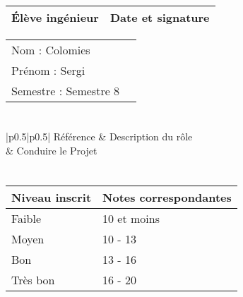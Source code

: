 \documentclass[11pt]{article}
\begin{document}

\begin{center}
\begin{table}[!hp]

	\begin{tabularx}{\linewidth}{|X|X|}
	\hline
	\rowcolor{gray!40} Élève ingénieur & Date et signature \\
	\hline
	\end{tabularx}
	\begin{tabularx}{\linewidth}{|X|X|}
	Nom : Colomies &  \\ 
	Prénom : Sergi & \\
	Semestre : Semestre 8 & \\
	\hline
	\end{tabularx}
\end{table}
\end{center}

\section*{\large\FR}

\centering
	\begin{longtable}{|p{0.5\textwidth}|p{0.5\textwidth}|}
	\hline
	 Référence \WBSCourt & Description du rôle \\
	 & Conduire le Projet \\
	 \hline
	\end{longtable}


\section*{\large\FC}


\begin{table}[!hp]
\centering
	\begin{tabularx}{\linewidth}{|X|X|}
	\hline
	\rowcolor{gray!40} Niveau inscrit & Notes correspondantes \\
	\hline
	 Faible & 10 et moins \\
	 \hline
	 Moyen & 10 - 13 \\
	 \hline
	 Bon & 13 - 16 \\
	 \hline
	 Très bon & 16 - 20 \\
	 \hline
	\end{tabularx}
\end{table}
\end{document}
